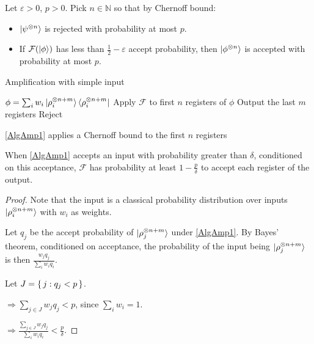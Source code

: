 Let $\varepsilon>0$, $p>0$. Pick $n\in\mathbb{N}$ so that by Chernoff bound:
\begin{itemize}
	\item $\ket{\psi^{\otimes n}}$ is rejected with probability at most $p$.
	\item If $\mathcal{F}(\ket{\phi})$ has less than $\frac{1}{2}-\varepsilon$ accept probability, then $\ket{\phi^{\otimes n}}$ is accepted with probability at most $p$.
\end{itemize}

\begin{algorithm}
	\caption{Amplification with simple input}
	\label{AlgAmp1}
	\begin{algorithmic}[1]
		\Require $\phi=\sum_i w_i\ket{\rho_i^{\otimes n+m}}\bra{\rho_i^{\otimes n+m}}$
		\State Apply $\mathcal{F}$ to first $n$ registers of $\phi$
			\State Output the last $m$ registers
		\Else
			\State Reject
		\EndIf
		\EndProcedure
	\end{algorithmic}
\end{algorithm}

\begin{observation}
	\autoref{AlgAmp1} applies a Chernoff bound to the first $n$ registers
\end{observation}

\begin{theorem}
	When \autoref{AlgAmp1} accepts an input with probability greater than $\delta$, conditioned on this acceptance, $\mathcal{F}$ has probability at least $1-\frac{p}{\delta}$ to accept each register of the output.
\end{theorem}
\begin{proof}
	Note that the input is a classical probability distribution over inputs $\ket{\rho_i^{\otimes n+m}}$ with $w_i$ as weights.

	Let $q_j$ be the accept probability of $\ket{\rho_j^{\otimes n+m}}$ under \autoref{AlgAmp1}. By Bayes' theorem, conditioned on acceptance, the probability of the input being $\ket{\rho_j^{\otimes n+m}}$ is then $\frac{w_j q_j}{\sum_i w_i q_i}$.

	Let $J=\set{j:q_j<p}$.

	$\Rightarrow\sum_{j\in J} w_j q_j<p$, since $\sum_i w_i=1$.
	
	$\Rightarrow\frac{\sum_{j\in J} w_j q_j}{\sum_i w_i q_i}<\frac{p}{\delta}$.
\end{proof}

